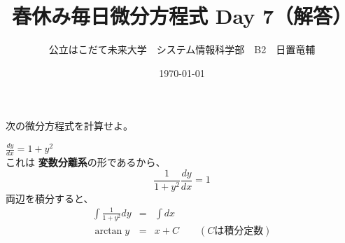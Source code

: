 \documentclass[dvipdfmx,uplatex]{jsarticle}
\title{春休み毎日微分方程式 Day 7（解答）}
\author{公立はこだて未来大学　システム情報科学部　B2　日置竜輔}
\date{\today}
\begin{document}
\begin{spacing}{1.6}
\maketitle

次の微分方程式を計算せよ。
\begin{qparts}
    \qpart $ \displaystyle \frac{dy}{dx} = 1 + y ^ 2 $ \\
    これは {\bf 変数分離系}の形であるから、\\
    \begin{equation*}
      \frac{1}{1 + y ^ 2} \frac{dy}{dx} = 1
    \end{equation*}
    両辺を積分すると、\\
    \begin{eqnarray*}
      \int \frac{1}{1 + y ^ 2}dy & = & \int dx \\
      \arctan y & = & x + C \qquad (Cは積分定数)
    \end{eqnarray*}

    \newpage


\end{qparts}
\end{spacing}
\end{document}
